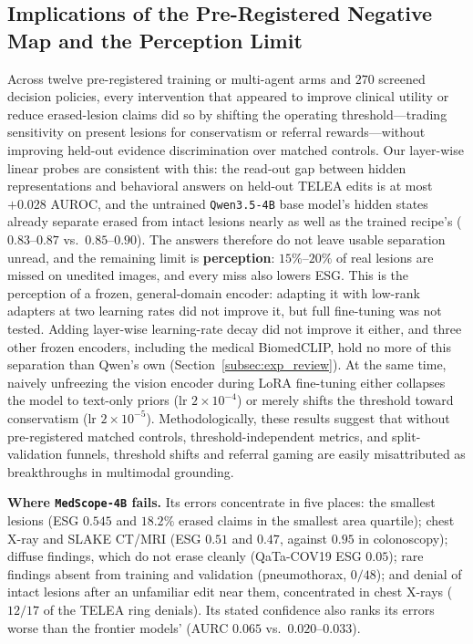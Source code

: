 \documentclass{article} %
\begin{document}
\subsection{Implications of the Pre-Registered Negative Map and the Perception Limit}
\label{subsec:disc_negative_map}
Across twelve pre-registered training or multi-agent arms and $270$ screened decision policies, every intervention that appeared to improve clinical utility or reduce erased-lesion claims did so by shifting the operating threshold---trading sensitivity on present lesions for conservatism or referral rewards---without improving held-out evidence discrimination over matched controls. Our layer-wise linear probes are consistent with this: the read-out gap between hidden representations and behavioral answers on held-out TELEA edits is at most $+0.028$ AUROC, and the untrained \texttt{Qwen3.5-4B} base model's hidden states already separate erased from intact lesions nearly as well as the trained recipe's ($0.83\text{--}0.87$ vs.\ $0.85\text{--}0.90$). The answers therefore do not leave usable separation unread, and the remaining limit is \textbf{perception}: $15\%\text{--}20\%$ of real lesions are missed on unedited images, and every miss also lowers ESG. This is the perception of a frozen, general-domain encoder: adapting it with low-rank adapters at two learning rates did not improve it, but full fine-tuning was not tested. Adding layer-wise learning-rate decay did not improve it either, and three other frozen encoders, including the medical BiomedCLIP, hold no more of this separation than Qwen's own (Section~\ref{subsec:exp_review}). At the same time, naively unfreezing the vision encoder during LoRA fine-tuning either collapses the model to text-only priors ($\text{lr } 2\times 10^{-4}$) or merely shifts the threshold toward conservatism ($\text{lr } 2\times 10^{-5}$). Methodologically, these results suggest that without pre-registered matched controls, threshold-independent metrics, and split-validation funnels, threshold shifts and referral gaming are easily misattributed as breakthroughs in multimodal grounding.

\textbf{Where \texttt{MedScope-4B} fails.} Its errors concentrate in five places: the smallest lesions (ESG $0.545$ and $18.2\%$ erased claims in the smallest area quartile); chest X-ray and SLAKE CT/MRI (ESG $0.51$ and $0.47$, against $0.95$ in colonoscopy); diffuse findings, which do not erase cleanly (QaTa-COV19 ESG $0.05$); rare findings absent from training and validation (pneumothorax, $0/48$); and denial of intact lesions after an unfamiliar edit near them, concentrated in chest X-rays ($12/17$ of the TELEA ring denials). Its stated confidence also ranks its errors worse than the frontier models' (AURC $0.065$ vs.\ $0.020$--$0.033$).
\end{document}
